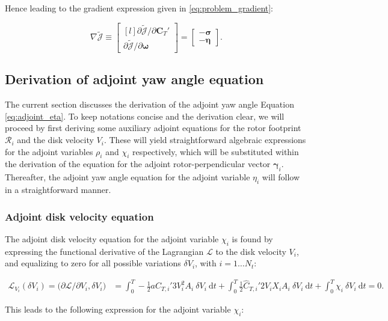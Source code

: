 \documentclass[energies,article,submit,moreauthors,latex,10pt,a4paper]{mdpi}
\newcommand{\bs}[1]{\boldsymbol{#1}}
\newcommand{\dt}{\text{d}t}
\newcommand{\Tint}{\int_{0}^{T}}
\newcommand{\ctihat}{\widehat{C}_{T,i}'}
\newcommand{\R}{\mathscr{R}}
\newcommand{\Jtilde}{\tilde{\mathscr{J}}}
\newcommand{\Lagr}{\mathscr{L}}
\newcommand{\innerproductsmall}[2]{\big( #1, #2 \big)}
\begin{document}
\noindent Hence leading to the gradient expression given in \eqref{eq:problem_gradient}:

\begin{equation}
\nabla \Jtilde \equiv 
\begin{bmatrix*}[l]
\partial \Jtilde / \partial \bs{C}_T' \\
\partial \Jtilde / \partial \bs{\omega} 
\end{bmatrix*} = 
\begin{bmatrix}
- \bs{\sigma}\\
- \bs{\eta}
\end{bmatrix}.
\end{equation}


\subsection{Derivation of adjoint yaw angle equation}\label{sec:app_adj_eta}
\noindent The current section discusses the derivation of the adjoint yaw angle Equation \eqref{eq:adjoint_eta}. To keep notations concise and the derivation clear, we will proceed by first deriving some auxiliary adjoint equations for the rotor footprint $\R_i$ and the disk velocity $V_i$. These will yield straightforward algebraic expressions for the adjoint variables $\rho_i$ and $\chi_i$ respectively, which will be substituted within the derivation of the equation for the adjoint rotor-perpendicular vector $\bs{\gamma}_i$. Thereafter, the adjoint yaw angle equation for the adjoint variable $\eta_i$ will follow in a straightforward manner.

\subsubsection{Adjoint disk velocity equation}
\noindent The adjoint disk velocity equation for the adjoint variable $\chi_i$ is found by expressing the functional derivative of the Lagrangian $\Lagr$ to the disk velocity $V_i$, and equalizing to zero for all possible variations $\delta V_i$, with $i = 1 \dots N_t$: 

\begin{align}
\Lagr_{V_i}(\delta V_i) = \innerproductsmall{\partial \Lagr / \partial V_i}{\delta V_i} &= \Tint -\frac{1}{2} a \ctihat 3 V_i^2 A_i ~\delta V_i ~\dt  + \Tint \frac{1}{2} \ctihat 2 V_i X_i  A_i ~\delta V_i ~\dt + \Tint \chi_i~ \delta V_i ~\dt = 0. 
\end{align}

\noindent This leads to the following expression for the adjoint variable $\chi_i$:
\end{document}
